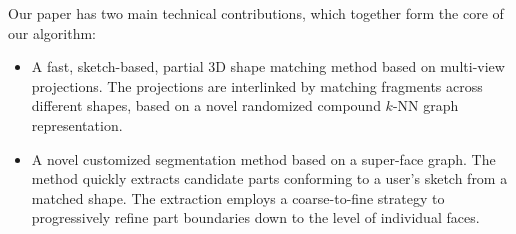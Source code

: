 Our paper has two main technical contributions, which together form the core of our algorithm:
\begin{itemize}
\setlength{\itemsep}{3pt}
\setlength{\parskip}{0pt}
\setlength{\parsep}{0pt}
\item A fast, sketch-based, partial 3D shape matching method based on multi-view projections. The projections are interlinked by matching fragments across different shapes, based on a novel randomized compound $k$-NN graph representation.
\item A novel customized segmentation method based on a super-face graph. The method quickly extracts candidate parts conforming to a user's sketch from a matched shape. The extraction employs a coarse-to-fine strategy to progressively refine part boundaries down to the level of individual faces.
\end{itemize}
